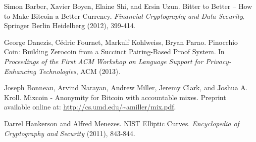 \documentclass[conference]{IEEEtran}
\begin{document}
\begin{thebibliography}{1}


 Simon Barber, Xavier Boyen, Elaine Shi, and Ersin Uzun. Bitter to Better -- How to Make Bitcoin a Better Currency. \emph{Financial Cryptography and Data Security}, Springer Berlin Heidelberg (2012), 399-414.



 George Danezis, C\'{e}dric Fournet, Markulf Kohlweiss, Bryan Parno. Pinocchio Coin: Building Zerocoin from a Succinct Pairing-Based Proof System. In \emph{Proceedings of the First ACM Workshop on Language Support for Privacy-Enhancing Technologies}, ACM (2013).

 Joseph Bonneau, Arvind Narayan, Andrew Miller, Jeremy Clark, and Joshua A. Kroll. Mixcoin - Anonymity for Bitcoin with accountable mixes. Preprint available online at: \url{http://cs.umd.edu/~amiller/mix.pdf}.

 Darrel Hankerson and Alfred Menezes. NIST Elliptic Curves. \emph{Encyclopedia of Cryptography and Security} (2011), 843-844.


\end{thebibliography}




\end{document}
